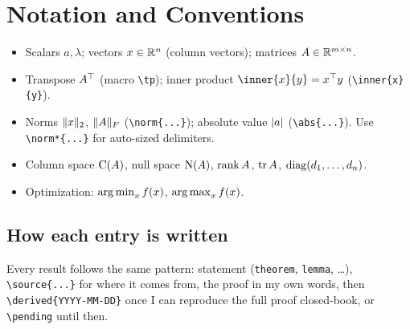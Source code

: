 \chapter{Notation and Conventions}

\begin{itemize}[leftmargin=*]
  \item Scalars $a, \lambda$; vectors $x \in \mathbb{R}^n$ (column vectors); matrices $A \in \mathbb{R}^{m \times n}$.
  \item Transpose $A^{\top}$ (macro \verb|\tp|); inner product $\inner{x}{y} = x\tp y$ (\verb|\inner{x}{y}|).
  \item Norms $\lVert x\rVert_2$, $\lVert A\rVert_F$ (\verb|\norm{...}|); absolute value $\lvert a\rvert$ (\verb|\abs{...}|).
        Use \verb|\norm*{...}| for auto-sized delimiters.
  \item Column space $\operatorname{C}(A)$, null space $\operatorname{N}(A)$, $\operatorname{rank} A$, $\operatorname{tr} A$, $\operatorname{diag}(d_1, \dots, d_n)$.
  \item Optimization: $\operatorname*{arg\,min}_x f(x)$, $\operatorname*{arg\,max}_x f(x)$.
\end{itemize}

\section*{How each entry is written}

Every result follows the same pattern: statement (\texttt{theorem}, \texttt{lemma}, \dots),
\verb|\source{...}| for where it comes from, the proof in my own words, then
\verb|\derived{YYYY-MM-DD}| once I can reproduce the full proof closed-book,
or \verb|\pending| until then.
